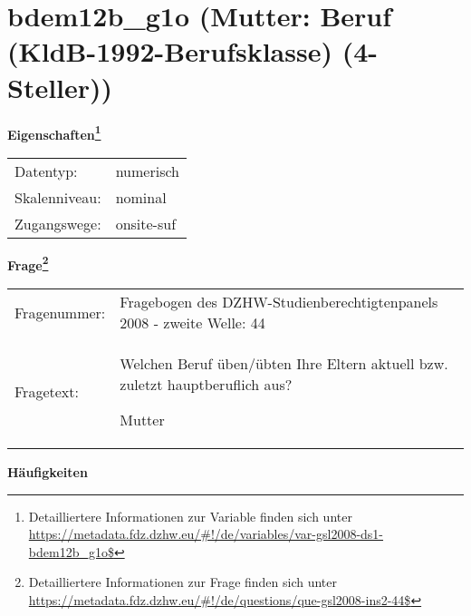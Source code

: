 
    \setcounter{footnote}{0}

    \vspace*{-1.8cm}
	\section{bdem12b\_g1o (Mutter: Beruf (KldB-1992-Berufsklasse) (4-Steller))}
	\label{section:bdem12b_g1o}



    \vspace*{0.5cm}
    \noindent\textbf{Eigenschaften\footnote{Detailliertere Informationen zur Variable finden sich unter
		\url{https://metadata.fdz.dzhw.eu/\#!/de/variables/var-gsl2008-ds1-bdem12b_g1o$}}}\\
	\begin{tabularx}{\hsize}{@{}lX}
	Datentyp: & numerisch \\
	Skalenniveau: & nominal \\
	Zugangswege: &
	  onsite-suf
 \\
    \end{tabularx}



				\vspace*{0.5cm}
                \noindent\textbf{Frage\footnote{Detailliertere Informationen zur Frage finden sich unter
		              \url{https://metadata.fdz.dzhw.eu/\#!/de/questions/que-gsl2008-ins2-44$}}}\\
				\begin{tabularx}{\hsize}{@{}lX}
					Fragenummer: &
					  Fragebogen des DZHW-Studienberechtigtenpanels 2008 - zweite Welle:
					  44
 \\
					Fragetext: & Welchen Beruf üben/übten Ihre Eltern aktuell bzw. zuletzt hauptberuflich aus?\par  Mutter \\
				\end{tabularx}





        		\vspace*{0.5cm}
                \noindent\textbf{Häufigkeiten}

